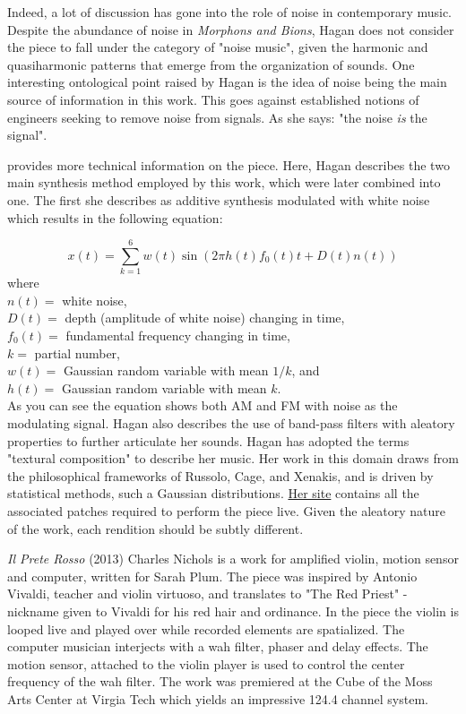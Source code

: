 Indeed, a lot of discussion has gone into the role of noise in contemporary music. Despite the abundance of noise in \textit{Morphons and Bions}, Hagan does not consider the piece to fall under the category of "noise music", given the harmonic and quasiharmonic patterns that emerge from the organization of sounds. One interesting ontological point raised by Hagan is the idea of noise being the main source of information in this work. This goes against established notions of engineers seeking to remove noise from signals. As she says: "the noise \textit{is} the signal". 

\cite{hagan2017textural} provides more technical information on the piece. Here, Hagan describes the two main synthesis method employed by this work, which were later combined into one. The first she describes as additive synthesis modulated with white noise which results in the following equation:

$$
x(t)=\sum_{k=1}^{6} w(t) \sin \left(2 \pi h(t) f_{0}(t) t+D(t) n(t)\right)
$$
where \\
$n(t)=$ white noise, \\
$D(t)=$ depth (amplitude of white noise) changing in time, \\ 
$f_{0}(t)=$ fundamental frequency changing in time, \\
$k=$ partial number, \\
$w(t)=$ Gaussian random variable with mean $1 / k$, and \\
$h(t)=$ Gaussian random variable with mean $k$.\\

As you can see the equation shows both AM and FM with noise as the modulating signal. Hagan also describes the use of band-pass filters with aleatory properties to further articulate her sounds. Hagan has adopted the terms "textural composition" to describe her music. Her work in this domain draws from the philosophical frameworks of Russolo, Cage, and Xenakis, and is driven by statistical methods, such a Gaussian distributions. \href{http://www.kerrylhagan.net/#m&b}{Her site} contains all the associated patches required to perform the piece live. Given the aleatory nature of the work, each rendition should be subtly different.

\textit{Il Prete Rosso} (2013) Charles Nichols is a work for amplified violin, motion sensor and computer, written for Sarah Plum. The piece was inspired by Antonio Vivaldi, teacher and violin virtuoso, and translates to "The Red Priest" - nickname given to Vivaldi for his red hair and ordinance. In the piece the violin is looped live and played over while recorded elements are spatialized. The computer musician interjects with a wah filter, phaser and delay effects. The motion sensor, attached to the violin player is used to control the center frequency of the wah filter. The work was premiered at the Cube of the Moss Arts Center at Virgia Tech which yields an impressive 124.4 channel system.


